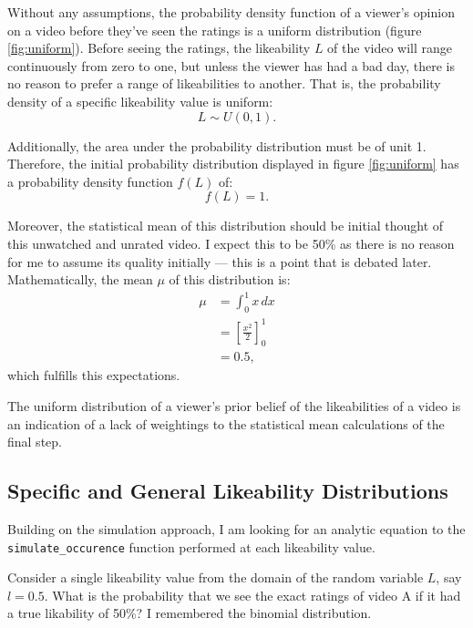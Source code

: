 \documentclass[a4paper,11pt]{article}
\newcommand*\Eval[3]{\left[#1\right]_{#3}^{#2}}
\begin{document}
Without any assumptions, the probability density function of a viewer's opinion on a video before they've seen the ratings is a uniform distribution (figure \ref{fig:uniform}). Before seeing the ratings, the likeability $L$ of the video will range continuously from zero to one, but unless the viewer has had a bad day, there is no reason to prefer a range of likeabilities to another. That is, the probability density of a specific likeability value is uniform:
\[
    L \sim U(0, 1).
\]


Additionally, the area under the probability distribution must be of unit 1. Therefore, the initial probability distribution displayed in figure \ref{fig:uniform} has a probability density function $f(L)$ of:
\[
    f(L) = 1.
\]

Moreover, the statistical mean of this distribution should be initial thought of this unwatched and unrated video. I expect this to be 50\% as there is no reason for me to assume its quality initially --- this is a point that is debated later. Mathematically, the mean $\mu$ of this distribution is:
\begin{align*}
    \mu &= \int_0^1 x \, dx\\
    &= \Eval{\frac{x^2}{2}}{1}{0}\\
    &= 0.5,
\end{align*}
which fulfills this expectations.

The uniform distribution of a viewer's prior belief of the likeabilities of a video is an indication of a lack of weightings to the statistical mean calculations of the final step.

\subsection{Specific and General Likeability Distributions}
Building on the simulation approach, I am looking for an analytic equation to the \verb|simulate_occurence| function performed at each likeability value.

Consider a single likeability value from the domain of the random variable $L$, say $l=0.5$. What is the probability that we see the exact ratings of video A if it had a true likability of 50\%? I remembered the binomial distribution.
\end{document}
